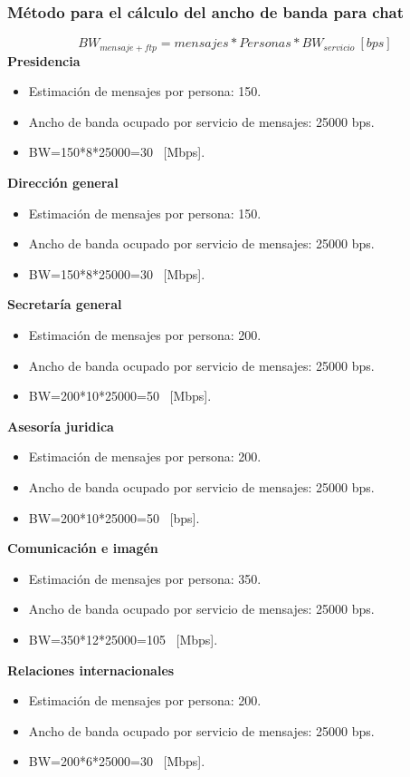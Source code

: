 \documentclass[12pt,letterpaper]{article}
\begin{document}
\subsubsection{Método para el cálculo del ancho de banda para chat}
\begin{equation}
    BW_{mensaje+ftp}=mensajes*Personas*BW_{servicio} \ [bps]
\end{equation}
\textbf{Presidencia}
\begin{itemize}
    \item Estimación de mensajes por persona: 150. 
    \item Ancho de banda ocupado por servicio de mensajes: 25000 bps.
    \item BW=150*8*25000=30 \ [Mbps].
\end{itemize}
\textbf{Dirección general}
\begin{itemize}
    \item Estimación de mensajes por persona: 150. 
    \item Ancho de banda ocupado por servicio de mensajes: 25000 bps.
    \item BW=150*8*25000=30 \ [Mbps].
\end{itemize}
\textbf{Secretaría general}
\begin{itemize}
    \item Estimación de mensajes por persona: 200. 
    \item Ancho de banda ocupado por servicio de mensajes: 25000 bps.
    \item BW=200*10*25000=50 \ [Mbps].
\end{itemize}
\textbf{Asesoría juridica}
\begin{itemize}
    \item Estimación de mensajes por persona: 200. 
    \item Ancho de banda ocupado por servicio de mensajes: 25000 bps.
    \item BW=200*10*25000=50 \ [bps].
\end{itemize}
\textbf{Comunicación e imagén}
\begin{itemize}
    \item Estimación de mensajes por persona: 350. 
    \item Ancho de banda ocupado por servicio de mensajes: 25000 bps.
    \item BW=350*12*25000=105 \ [Mbps].
\end{itemize}
\textbf{Relaciones internacionales}
\begin{itemize}
    \item Estimación de mensajes por persona: 200. 
    \item Ancho de banda ocupado por servicio de mensajes: 25000 bps.
    \item BW=200*6*25000=30 \ [Mbps].
\end{itemize}
\end{document}
